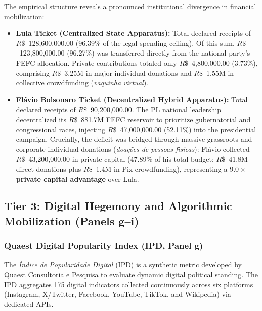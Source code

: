 The empirical structure reveals a pronounced institutional divergence in financial mobilization:
\begin{itemize}
    \item \textbf{Lula Ticket (Centralized State Apparatus):} Total declared receipts of $R\$$~128,600,000.00 (96.39\% of the legal spending ceiling). Of this sum, $R\$$~123,800,000.00 (96.27\%) was transferred directly from the national party's FEFC allocation. Private contributions totaled only $R\$$~4,800,000.00 (3.73\%), comprising $R\$$~3.25M in major individual donations and $R\$$~1.55M in collective crowdfunding (\emph{vaquinha virtual}).
    \item \textbf{Fl{\'a}vio Bolsonaro Ticket (Decentralized Hybrid Apparatus):} Total declared receipts of $R\$$~90,200,000.00. The PL national leadership decentralized its $R\$$~881.7M FEFC reservoir to prioritize gubernatorial and congressional races, injecting $R\$$~47,000,000.00 (52.11\%) into the presidential campaign. Crucially, the deficit was bridged through massive grassroots and corporate individual donations (\emph{doa{\c{c}}{\~o}es de pessoas f{\'\i}sicas}): Fl{\'a}vio collected $R\$$~43,200,000.00 in private capital (47.89\% of his total budget; $R\$$~41.8M direct donations plus $R\$$~1.4M in Pix crowdfunding), representing a \textbf{$9.0\times$ private capital advantage} over Lula.
\end{itemize}

\subsection*{Tier 3: Digital Hegemony and Algorithmic Mobilization (Panels g--i)}

\subsubsection*{Quaest Digital Popularity Index (IPD, Panel g)}
The \emph{{\'{I}}ndice de Popularidade Digital} (IPD) is a synthetic metric developed by Quaest Consultoria e Pesquisa \citep{nunes2022ipd,quaest2026ipd} to evaluate dynamic digital political standing. The IPD aggregates 175 digital indicators collected continuously across six platforms (Instagram, X/Twitter, Facebook, YouTube, TikTok, and Wikipedia) via dedicated APIs. 

